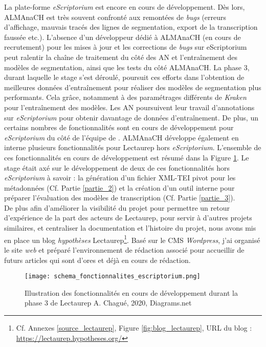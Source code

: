 La plate-forme \textit{eScriptorium} est encore en cours de développement. Dès lors, ALMAnaCH est très souvent confronté aux remontées de \textit{bugs} (erreurs d'affichage, mauvais tracés des lignes de segmentation, export de la transcription faussée etc.). L'absence d'un développeur dédié à ALMAnaCH (en cours de recrutement) pour les mises à jour et les corrections de \textit{bugs} sur eScriptorium peut ralentir la chaîne de traitement du côté des AN et l'entraînement des modèles de segmentation, ainsi que les tests du côté ALMAnaCH. 
\newpage
La phase 3, durant laquelle le stage s'est déroulé, poursuit ces efforts dans l'obtention de meilleures données d'entraînement pour réaliser des modèles de segmentation plus performants. Cela grâce, notamment à des paramétrages différents de \textit{Kraken} pour l'entraînement des modèles. Les AN poursuivent leur travail d'annotations sur \textit{eScriptorium} pour obtenir davantage de données d'entraînement. De plus, un certains nombres de fonctionnalités sont en cours de développement pour \textit{eScriptorium} du côté de l'équipe de . ALMAnaCH développe également en interne plusieurs fonctionnalités pour Lectaurep hors \textit{eScriptorium}. L'ensemble de ces fonctionnalités en cours de développement est résumé dans la Figure \ref{fig:fonctionnalites_eScripto}. Le stage était axé sur le développement de deux de ces fonctionnalités hors \textit{eScriptorium} à savoir : la génération d'un fichier XML-TEI pivot pour les métadonnées (Cf. Partie \ref{partie_2}) et la création d'un outil interne pour préparer l'évaluation des modèles de transcription (Cf. Partie \ref{partie_3}).\\

De plus afin d'améliorer la visibilité du projet pour permettre un retour d'expérience de la part des acteurs de Lectaurep, pour servir à d'autres projets similaires, et centraliser la documentation et l'histoire du projet, nous avons mis en place un blog \textit{hypothèses} Lectaurep\footnote{Cf. Annexes \ref{source_lectaurep}, Figure \ref{fig:blog_lectaurep}, URL du blog : \url{https://lectaurep.hypotheses.org/}}. Basé sur le CMS \textit{Wordpress}, j'ai organisé le site \textit{web} et préparé l'environnement de rédaction associé pour accueillir de futurs articles qui sont d'ores et déjà en cours de rédaction.

\begin{figure}[h!]
  \begin{sideways}
    \texttt{[image: schema\_fonctionnalites\_escriptorium.png]}
  \end{sideways}
  \centering
  \caption{Illustration des fonctionnalités en cours de développement durant la phase 3 de Lectaurep \textcopyright A. Chagué, 2020, Diagrams.net}
  \label{fig:fonctionnalites_eScripto}
\end{figure}
\clearpage


